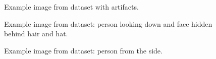 \documentclass[12pt, a4paper]{article}
\begin{document}
\begin{figure}
    \caption{Example image from dataset with artifacts.}
    \label{fig:badDatasetImage3}
\end{figure}
\begin{figure}
    \caption{Example image from dataset: person looking down and face hidden behind hair and hat.}
    \label{fig:wrongDirectionImage}
\end{figure}
\begin{figure}
    \caption{Example image from dataset: person from the side.}
    \label{fig:wrongDirectionImage2}
\end{figure}
\end{document}
